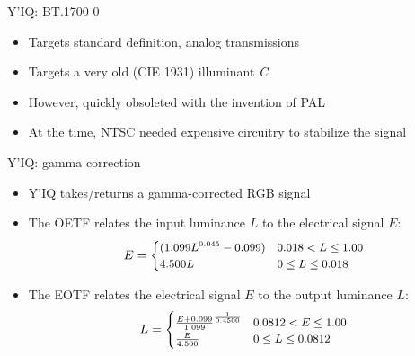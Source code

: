 \documentclass[aspectratio=169,usepdftitle=false]{fireshonks}
\begin{document}
\begin{frame}{Y'IQ: BT.1700-0}
    \begin{itemize}
        \item Targets standard definition, analog transmissions
        \item Targets a very old (CIE 1931) illuminant \emph{C}
        \item However, quickly obsoleted with the invention of PAL
        \item At the time, NTSC needed expensive circuitry to stabilize the signal
    \end{itemize}

\end{frame}
\begin{frame}{Y'IQ: gamma correction}
    \begin{itemize}
        \item Y'IQ takes/returns a gamma-corrected RGB signal
        \item The OETF relates the input luminance $L$ to the electrical signal $E$: \begin{equation}
                  \small
                  E = \begin{cases}
                      (1.099L^{0.045} - 0.099) & 0.018 < L \leq 1.00 \\
                      4.500L                   & 0 \leq L \leq 0.018
                  \end{cases}
              \end{equation}
        \item The EOTF relates the electrical signal $E$ to the output luminance $L$: \begin{equation}
                  \small
                  L = \begin{cases}
                      \frac{E + 0.099}{1.099}^\frac{1}{0.4500} & 0.0812 < E \leq 1.00 \\
                      \frac{E}{4.500}                          & 0 \leq L \leq 0.0812
                  \end{cases}
              \end{equation}
    \end{itemize}
\end{frame}
\end{document}
